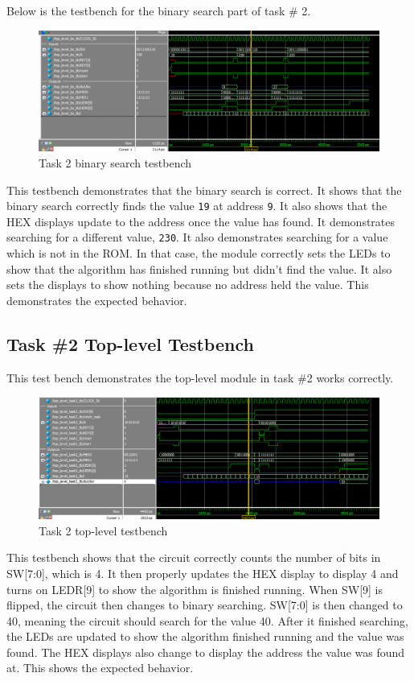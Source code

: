 \documentclass[11pt, titlepage]{article}
\begin{document}
            Below is the testbench for the binary search part of task \# 2.
            \begin{figure}[H]
                \centering
                \includegraphics[scale=0.52]{Images/binary search testbench.png}
                \caption{Task 2 binary search testbench}
            \end{figure}
            This testbench demonstrates that the binary search is correct. It shows that the binary search correctly finds the value \texttt{19} at address \texttt{9}. It also shows that the HEX displays update to the address once the value has found. It demonstrates searching for a different value, \texttt{230}. It also demonstrates searching for a value which is not in the ROM. In that case, the module correctly sets the LEDs to show that the algorithm has finished running but didn't find the value. It also sets the displays to show nothing because no address held the value. This demonstrates the expected behavior. 

        \newpage
        \subsection{Task \#2 Top-level Testbench}
            This test bench demonstrates the top-level module in task \#2 works correctly.

            \begin{figure}[H]
                \centering
                \includegraphics[scale=0.52]{Images/binary search top level testbench.png}
                \caption{Task 2 top-level testbench}
            \end{figure}
            This testbench shows that the circuit correctly counts the number of bits in SW[7:0], which is 4. It then properly updates the HEX display to display 4 and turns on LEDR[9] to show the algorithm is finished running. When SW[9] is flipped, the circuit then changes to binary searching. SW[7:0] is then changed to 40, meaning the circuit should search for the value 40. After it finished searching, the LEDs are updated to show the algorithm finished running and the value was found. The HEX displays also change to display the address the value was found at. This shows the expected behavior. 
        \newpage
\end{document}

